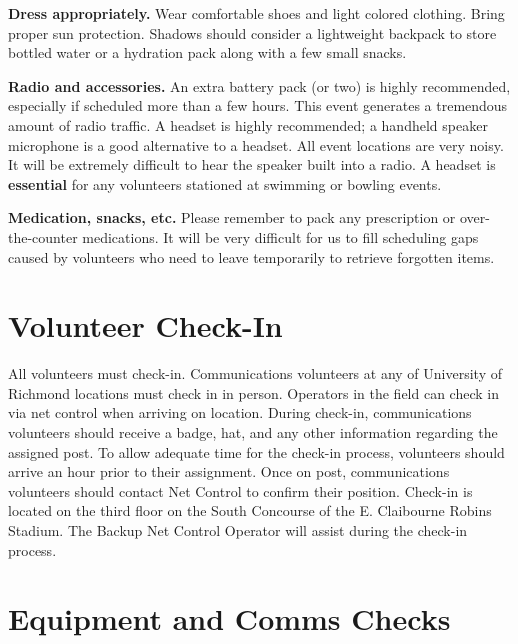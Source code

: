 \documentclass[pdflatex,letterpaper,twoside,12pt]{book}
\begin{document}
\textbf{Dress appropriately.}  Wear comfortable shoes and light colored clothing.  Bring proper sun protection.  Shadows should consider a lightweight backpack to store bottled water or a hydration pack along with a few small snacks.

\textbf{Radio and accessories.}  An extra battery pack (or two) is highly recommended, especially if scheduled more than a few hours.  This event generates a tremendous amount of radio traffic.  A headset is highly recommended;  a handheld speaker microphone is a good alternative to a headset.  All event locations are very noisy.  It will be extremely difficult to hear the speaker built into a radio.  A headset is \textbf{essential} for any volunteers stationed at swimming or bowling events.

\textbf{Medication, snacks, etc.}  Please remember to pack any prescription or over-the-counter medications.  It will be very difficult for us to fill scheduling gaps caused by volunteers who need to leave temporarily to retrieve forgotten items.


\section{Volunteer Check-In}

All volunteers must check-in.  Communications volunteers at any of University of Richmond locations must check in in person.  Operators in the field can check in via net control when arriving on location.  During check-in, communications volunteers should receive a badge, hat, and any other information regarding the assigned post.  To allow adequate time for the check-in process, volunteers should arrive an hour prior to their assignment.  Once on post, communications volunteers should contact Net Control to confirm their position.  Check-in is located on the third floor on the South Concourse of the E. Claibourne Robins Stadium.  The Backup Net Control Operator will assist during the check-in process.


\section{Equipment and Comms Checks}
\end{document}
